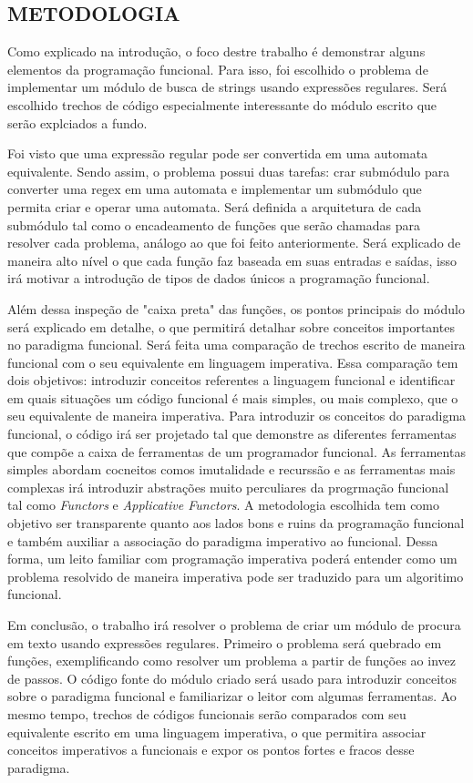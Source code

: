 \subsection{METODOLOGIA}

Como explicado na introdução, o foco destre trabalho é demonstrar alguns  elementos da programação funcional.
Para isso, foi escolhido o problema de implementar um módulo de busca de strings usando expressões regulares.
Será escolhido trechos de código especialmente interessante do módulo escrito que serão explciados a fundo.

Foi visto que uma expressão regular pode ser convertida em uma automata equivalente.
Sendo assim, o problema possui duas tarefas: crar submódulo para converter uma regex em uma automata e implementar um submódulo que permita criar e operar uma automata.
Será definida a arquitetura de cada submódulo tal como o encadeamento de funções que serão chamadas para resolver cada problema, análogo ao que foi feito anteriormente.
Será explicado de maneira alto nível o que cada função faz baseada em suas entradas e saídas, isso irá motivar a introdução de tipos de dados únicos a programação funcional.

Além dessa inspeção de "caixa preta" das funções, os pontos principais do módulo será explicado em detalhe, o que permitirá detalhar sobre conceitos importantes no paradigma funcional.
Será feita uma comparação de trechos escrito de maneira funcional com o seu equivalente em linguagem imperativa.
Essa comparação tem dois objetivos: introduzir conceitos referentes a linguagem funcional e identificar em quais situações um código funcional é mais simples, ou mais complexo, que o seu equivalente de maneira imperativa.
Para introduzir os conceitos do paradigma funcional, o código irá ser projetado tal que demonstre as diferentes ferramentas que compõe a caixa de ferramentas de um programador funcional.
As ferramentas simples abordam cocneitos comos imutalidade e recurssão e as ferramentas mais complexas irá introduzir abstrações muito perculiares da progrmação funcional tal como \emph{Functors} e \emph{Applicative Functors}.
A metodologia escolhida tem como objetivo ser transparente quanto aos lados bons e ruins da programação funcional e também auxiliar a associação do paradigma imperativo ao funcional.
Dessa forma, um leito familiar com programação imperativa poderá entender como um problema resolvido de maneira imperativa pode ser traduzido para um algoritimo funcional.

Em conclusão, o trabalho irá resolver o problema de criar um módulo de procura em texto usando expressões regulares.
Primeiro o problema será quebrado em funções, exemplificando como resolver um problema a partir de funções ao invez de passos.
O código fonte do módulo criado será usado para introduzir conceitos sobre o paradigma funcional e familiarizar o leitor com algumas ferramentas.
Ao mesmo tempo, trechos de códigos funcionais serão comparados com seu equivalente escrito em uma linguagem imperativa, o que permitira associar conceitos imperativos a funcionais e expor os pontos fortes e fracos desse paradigma.
